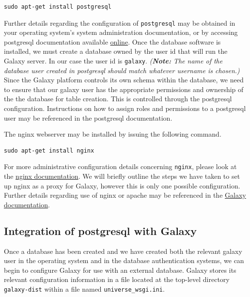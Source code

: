 \documentclass[a4paper,10pt]{article}
\begin{document}
\begin{lstlisting}
sudo apt-get install postgresql
\end{lstlisting}

Further details regarding the configuration of \texttt{\footnotesize{postgresql}} may be obtained in your operating system's system administration documentation, or by accessing postgresql documentation available \href{http://www.postgresql.org/}{online}.  Once the database software is installed, we must create a database owned by the user id that will run the Galaxy server.  In our case the user id is \texttt{\footnotesize{galaxy}}.  \textit{(\textbf{Note:} The name of the database user created in postgresql should match whatever username is chosen.)}  Since the Galaxy platform controls its own schema within the database, we need to ensure that our galaxy user has the appropriate permissions and ownership of the the database for table creation.  This is controlled through the postgresql configuration.  Instructions on how to assign roles and permissions to a postgresql user may be referenced in the postgresql documentation.

The nginx webserver may be installed by issuing the following command.

\begin{lstlisting}
sudo apt-get install nginx
\end{lstlisting}

For more administrative configuration details concerning \texttt{\footnotesize{nginx}}, please look at the \href{http://nginx.org/en/docs/}{nginx documentation}.  We will briefly outline the steps we have taken to set up nginx as a proxy for Galaxy, however this is only one possible configuration.  Further details regarding use of nginx or apache may be referenced in the \href{https://wiki.galaxyproject.org/Admin/Config/Performance/ProductionServer}{Galaxy documentation}.

\subsection{Integration of postgresql with Galaxy}
Once a database has been created and we have created both the relevant galaxy user in the operating system and in the database authentication systems, we can begin to configure Galaxy for use with an external database.
Galaxy stores its relevant configuration information in a file located at the top-level directory \texttt{\footnotesize{galaxy-dist}} within a file named \texttt{\footnotesize{universe\_wsgi.ini}}.
\end{document}
